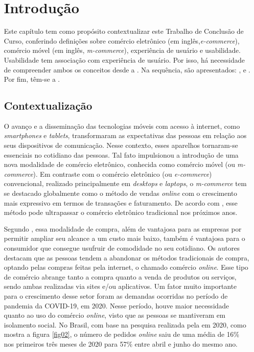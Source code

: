 
\chapter[Introdução]{Introdução} \label{introducao}
Este capítulo tem como propósito contextualizar este Trabalho de Conclusão de Curso, conferindo definições sobre comércio eletrônico (em inglês,\textit{e-commerce}), comércio móvel (em inglês, \textit{m-commerce}), experiência de usuário e usabilidade. Usabilidade tem associação com experiência de usuário. Por isso, há necessidade de compreender ambos os conceitos desde a . Na sequência, são apresentados: ,  e . Por fim, têm-se a .


\section{Contextualização} \label{con}
O avanço e a disseminação das tecnologias móveis com acesso à internet, como \textit{smartphones} e \textit{tablets}, transformaram as expectativas das pessoas em relação aos seus dispositivos de comunicação. Nesse contexto, esses aparelhos tornaram-se essenciais no cotidiano das pessoas. Tal fato impulsionou a introdução de uma nova modalidade de comércio eletrônico, conhecida como comércio móvel (ou \textit{m-commerce}). Em contraste com o comércio eletrônico (ou \textit{e-commerce}) convencional, realizado principalmente em \textit{desktops} e \textit{laptops}, o \textit{m-commerce} tem se destacado globalmente como o método de vendas \textit{online} com o crescimento mais expressivo em termos de transações e faturamento. De acordo com , esse método pode ultrapassar o comércio eletrônico tradicional nos próximos anos. 

Segundo , essa modalidade de compra, além de vantajosa para as empresas por permitir ampliar seu alcance a um custo mais baixo, também é vantajosa para o consumidor que consegue usufruir de comodidade no seu cotidiano. Os autores destacam que as pessoas tendem a abandonar os métodos tradicionais de compra, optando pelas compras feitas pela internet, o chamado comércio \textit{online}. Esse tipo de comércio abrange tanto a compra quanto a venda de produtos ou serviços, sendo ambas realizadas via sites e/ou aplicativos. Um fator muito importante para o crescimento desse setor foram as demandas ocorridas no período de pandemia da COVID-19, em 2020. Nesse período, houve maior necessidade quanto ao uso do comércio \textit{online}, visto que as pessoas se mantiveram em isolamento social. No Brasil, com base na pesquisa realizada pela  em 2020, como mostra a figura \ref{fig02}, o número de pedidos \textit{online} saiu de uma média de 16\% nos primeiros três meses de 2020 para 57\% entre abril e junho do mesmo ano.

